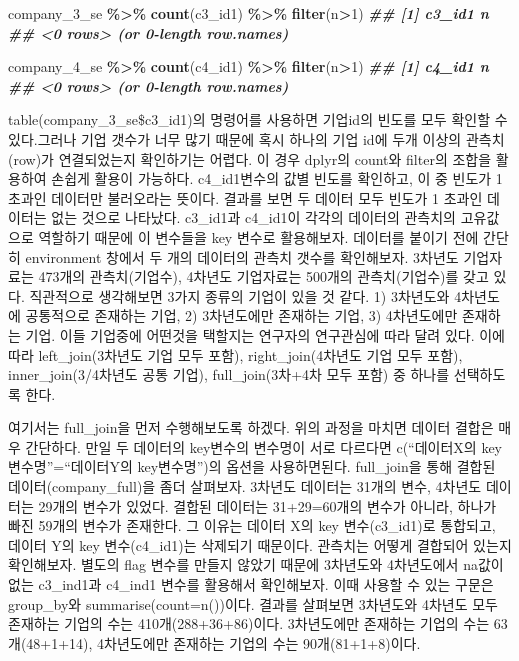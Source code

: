 \documentclass[
]{book}
\newenvironment{Shaded}{\begin{snugshade}}{\end{snugshade}}
\newcommand{\DecValTok}[1]{\textcolor[rgb]{0.00,0.00,0.81}{#1}}
\newcommand{\DocumentationTok}[1]{\textcolor[rgb]{0.56,0.35,0.01}{\textbf{\textit{#1}}}}
\newcommand{\FunctionTok}[1]{\textcolor[rgb]{0.13,0.29,0.53}{\textbf{#1}}}
\newcommand{\NormalTok}[1]{#1}
\newcommand{\SpecialCharTok}[1]{\textcolor[rgb]{0.81,0.36,0.00}{\textbf{#1}}}
\begin{document}
\begin{Shaded}
\begin{Highlighting}[]
\NormalTok{company\_3\_se }\SpecialCharTok{\%\textgreater{}\%} 
  \FunctionTok{count}\NormalTok{(c3\_id1) }\SpecialCharTok{\%\textgreater{}\%} 
  \FunctionTok{filter}\NormalTok{(n}\SpecialCharTok{\textgreater{}}\DecValTok{1}\NormalTok{)}
\DocumentationTok{\#\# [1] c3\_id1 n     }
\DocumentationTok{\#\# \textless{}0 rows\textgreater{} (or 0{-}length row.names)}

\NormalTok{company\_4\_se }\SpecialCharTok{\%\textgreater{}\%} 
  \FunctionTok{count}\NormalTok{(c4\_id1) }\SpecialCharTok{\%\textgreater{}\%} 
  \FunctionTok{filter}\NormalTok{(n}\SpecialCharTok{\textgreater{}}\DecValTok{1}\NormalTok{)}
\DocumentationTok{\#\# [1] c4\_id1 n     }
\DocumentationTok{\#\# \textless{}0 rows\textgreater{} (or 0{-}length row.names)}
\end{Highlighting}
\end{Shaded}

table(company\_3\_se\$c3\_id1)의 명령어를 사용하면 기업id의 빈도를 모두 확인할 수 있다.그러나 기업 갯수가 너무 많기 때문에 혹시 하나의 기업 id에 두개 이상의 관측치(row)가 연결되었는지 확인하기는 어렵다. 이 경우 dplyr의 count와 filter의 조합을 활용하여 손쉽게 활용이 가능하다. c4\_id1변수의 값별 빈도를 확인하고, 이 중 빈도가 1 초과인 데이터만 불러오라는 뜻이다. 결과를 보면 두 데이터 모두 빈도가 1 초과인 데이터는 없는 것으로 나타났다.
c3\_id1과 c4\_id1이 각각의 데이터의 관측치의 고유값으로 역할하기 때문에 이 변수들을 key 변수로 활용해보자. 데이터를 붙이기 전에 간단히 environment 창에서 두 개의 데이터의 관측치 갯수를 확인해보자. 3차년도 기업자료는 473개의 관측치(기업수), 4차년도 기업자료는 500개의 관측치(기업수)를 갖고 있다. 직관적으로 생각해보면 3가지 종류의 기업이 있을 것 같다. 1) 3차년도와 4차년도에 공통적으로 존재하는 기업, 2) 3차년도에만 존재하는 기업, 3) 4차년도에만 존재하는 기업. 이들 기업중에 어떤것을 택할지는 연구자의 연구관심에 따라 달려 있다. 이에 따라 left\_join(3차년도 기업 모두 포함), right\_join(4차년도 기업 모두 포함), inner\_join(3/4차년도 공통 기업), full\_join(3차+4차 모두 포함) 중 하나를 선택하도록 한다.

여기서는 full\_join을 먼저 수행해보도록 하겠다. 위의 과정을 마치면 데이터 결합은 매우 간단하다. 만일 두 데이터의 key변수의 변수명이 서로 다르다면 c(``데이터X의 key변수명''=``데이터Y의 key변수명'')의 옵션을 사용하면된다. full\_join을 통해 결합된 데이터(company\_full)을 좀더 살펴보자. 3차년도 데이터는 31개의 변수, 4차년도 데이터는 29개의 변수가 있었다. 결합된 데이터는 31+29=60개의 변수가 아니라, 하나가 빠진 59개의 변수가 존재한다. 그 이유는 데이터 X의 key 변수(c3\_id1)로 통합되고, 데이터 Y의 key 변수(c4\_id1)는 삭제되기 때문이다. 관측치는 어떻게 결합되어 있는지 확인해보자. 별도의 flag 변수를 만들지 않았기 때문에 3차년도와 4차년도에서 na값이 없는 c3\_ind1과 c4\_ind1 변수를 활용해서 확인해보자. 이때 사용할 수 있는 구문은 group\_by와 summarise(count=n())이다. 결과를 살펴보면 3차년도와 4차년도 모두 존재하는 기업의 수는 410개(288+36+86)이다. 3차년도에만 존재하는 기업의 수는 63개(48+1+14), 4차년도에만 존재하는 기업의 수는 90개(81+1+8)이다.
\end{document}
